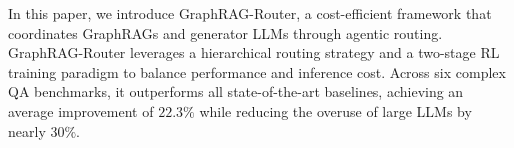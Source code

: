 In this paper, we introduce GraphRAG-Router, a cost-efficient framework that coordinates GraphRAGs and generator LLMs through agentic routing. GraphRAG-Router leverages a hierarchical routing strategy and a two-stage RL training paradigm to balance performance and inference cost. Across six complex QA benchmarks, it outperforms all state-of-the-art baselines, achieving an average improvement of $22.3\%$ while reducing the overuse of large LLMs by nearly $30\%$.
